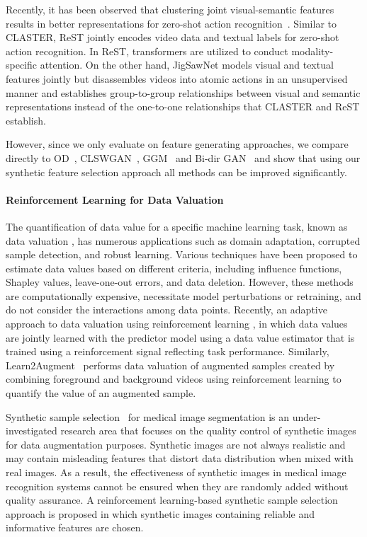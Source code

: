 \documentclass[10pt,twocolumn,letterpaper]{article}
\begin{document}
Recently, it has been observed that clustering joint visual-semantic features results in better representations for zero-shot action recognition~\cite{claster}. Similar to CLASTER, ReST \cite{rest} jointly encodes video data and textual labels for zero-shot action recognition. In ReST, transformers are utilized to conduct modality-specific attention. On the other hand, JigSawNet \cite{jigsaw} models visual and textual features jointly but disassembles videos into atomic actions in an unsupervised manner and establishes group-to-group relationships between visual and semantic representations instead of the one-to-one relationships that CLASTER and ReST establish.

However, since we only evaluate on feature generating approaches, we compare directly to OD~\cite{OD}, CLSWGAN~\cite{clswgan}, GGM~\cite{GGM2018} and Bi-dir GAN~\cite{syn} and show that using our synthetic feature selection approach all methods can be improved significantly.



\paragraph{Reinforcement Learning for Data Valuation}

The quantification of data value for a specific machine learning task, known as data valuation \cite{smart,jia2019towards,wu2022davinz}, has numerous applications such as domain adaptation, corrupted sample detection, and robust learning. Various techniques have been proposed to estimate data values based on different criteria, including influence functions, Shapley values, leave-one-out errors, and data deletion. However, these methods are computationally expensive, necessitate model perturbations or retraining, and do not consider the interactions among data points. Recently, an adaptive approach to data valuation using reinforcement learning \cite{yoon2020data}, in which data values are jointly learned with the predictor model using a data value estimator that is trained using a reinforcement signal reflecting task performance. Similarly, Learn2Augment~\cite{L2A} performs data valuation of augmented samples created by combining foreground and background videos using reinforcement learning to quantify the value of an augmented sample.

Synthetic sample selection~\cite{ye2020synthetic} for medical image segmentation is an under-investigated research area that focuses on the quality control of synthetic images for data augmentation purposes. Synthetic images are not always realistic and may contain misleading features that distort data distribution when mixed with real images. As a result, the effectiveness of synthetic images in medical image recognition systems cannot be ensured when they are randomly added without quality assurance. A reinforcement learning-based synthetic sample selection approach is proposed in which synthetic images containing reliable and informative features are chosen.
\end{document}
